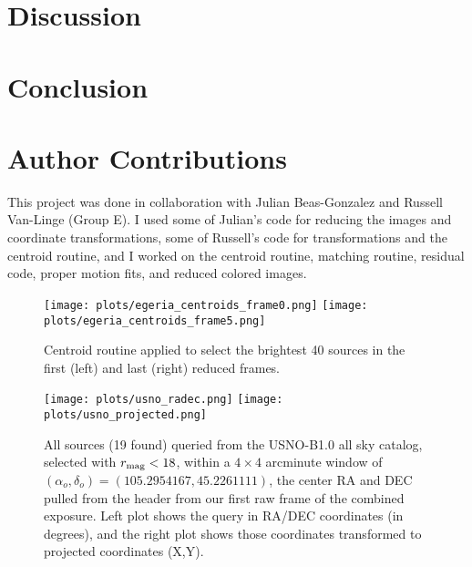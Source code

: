\documentclass[preprint]{aastex62}
\begin{document}
\section{Discussion} \label{sec:discussion}


\section{Conclusion}


\section{Author Contributions}
This project was done in collaboration with Julian Beas-Gonzalez and Russell Van-Linge (Group
E). I used some of Julian's code for reducing the images and coordinate transformations, some of Russell's code for transformations and the centroid routine, and I worked on the centroid routine, matching routine, residual code, proper motion fits, and reduced colored images.


\begin{figure}[H]
\begin{center}
\texttt{[image: plots/egeria\_centroids\_frame0.png]}
\texttt{[image: plots/egeria\_centroids\_frame5.png]}
\caption{Centroid routine applied to select the brightest 40 sources in the first (left) and last (right) reduced frames.} \label{fig:centroids}
\end{center}
\end{figure}


\begin{figure}[H]
\begin{center}
\texttt{[image: plots/usno\_radec.png]}
\texttt{[image: plots/usno\_projected.png]}
\caption{All sources (19 found) queried from the USNO-B1.0 all sky catalog, selected with $r_{\rm mag}<18$, within a $4\times4$ arcminute window of $(\alpha_o, \delta_o)=(105.2954167, 45.2261111)$, the center RA and DEC pulled from the header from our first raw frame of the combined exposure. Left plot shows the query in RA/DEC coordinates (in degrees), and the right plot shows those coordinates transformed to projected coordinates (X,Y).} \label{fig:usno_proj}
\end{center}
\end{figure}
\end{document}
